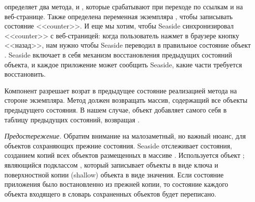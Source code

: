 \documentclass[a4paper,10pt,twoside]{book}
\begin{document}
 определяет два метода,  и ,
которые срабатывают при переходе по ссылкам \link{++} и \link{--\,--}
на веб-странице.
Также определена переменная экземпляра ,
чтобы записывать состояние <<counter>>.
И еще мы хотим, чтобы Seaside синхронизировал <<counter>>
с веб-страницей: когда пользователь нажмет в браузере кнопку <<назад>>,
нам нужно чтобы Seaside переводил в правильное состояние
объект .
Seaside включает в себя механизм восстановления предыдущих
состояний объекта, и каждое приложение может сообщить Seaside,
какие части требуется восстановить.


Компонент разрешает возрат в предыдущее состояние реализацией
метода  на стороне экземпляра.
Метод  должен возвращать массив,
содержащий все объекты предыдущего состояния. В нашем случае,
объект  добавляет самого себя в таблицу предыдущих
состояний, возвращая .


\emph{Предостережение.}
Обратим внимание на малозаметный, но важный нюанс,
для объектов сохраняющих прежние состояния.
Seaside отслеживает состояния, созданием копий всех объектов размещенных в массиве .
Используется объект ; являющийся подклассом ,
который записывает объекты в виде ключа и поверхностной копии (shallow) объекта в виде значения.
Если состояние приложения было востановленно из прежней копии,
то состояние каждого объекта входящего в словарь сохраненных объектов
будет переписано.
\end{document}
